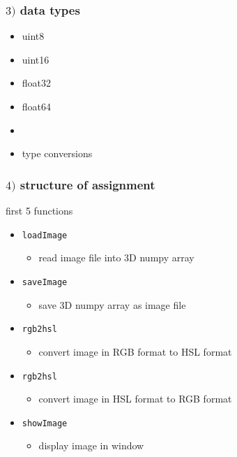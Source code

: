 \documentclass[english,14pt]{beamer}
\begin{document}

\begin{frame}[fragile]

\frametitle{$3)$ data types}

\begin{itemize}
	\item uint8
	\item uint16
	\item float32
	\item float64
	\item[]
	\item type conversions
		
\end{itemize}

\end{frame}


\begin{frame}[fragile]

\frametitle{$4)$ structure of assignment}

 first 5 functions
\begin{itemize}
	\item \texttt{loadImage}
	\begin{itemize}
		\item read image file into 3D numpy array
	\end{itemize}
		
	\item \texttt{saveImage}
	\begin{itemize}
		\item save 3D numpy array as image file
	\end{itemize}
			
	\item \texttt{rgb2hsl}
	\begin{itemize}
		\item convert image in RGB format to HSL format
	\end{itemize}
			
	\item \texttt{rgb2hsl}
	\begin{itemize}
		\item convert image in HSL format to RGB format
	\end{itemize}
			
	\item \texttt{showImage}
	\begin{itemize}
		\item display image in window
	\end{itemize}
\end{itemize}

\end{frame}
\end{document}
